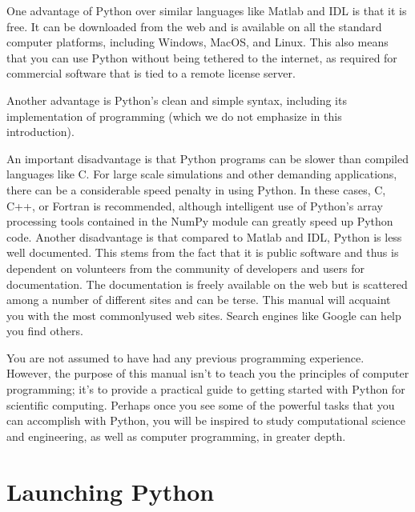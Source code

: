 \documentclass[letterpaper,10pt,english]{sphinxmanual}
\begin{document}
\sphinxAtStartPar
One advantage of Python over similar languages like Matlab and IDL is that it is free.  It can be downloaded from the web and is available on all the standard computer platforms, including Windows, MacOS, and Linux.  This also means that you can use Python without being tethered to the internet, as required for commercial software that is tied to a remote license server.

\sphinxAtStartPar
Another advantage is Python’s clean and simple syntax, including its implementation of  programming (which we do not emphasize in this introduction).

\sphinxAtStartPar
An important disadvantage is that Python programs can be slower than compiled languages like C.  For large scale simulations and other demanding applications, there can be a considerable speed penalty in using Python.  In these cases, C, C++, or Fortran is recommended, although intelligent use of Python’s array processing tools contained in the NumPy module can greatly speed up Python code.  Another disadvantage is that compared to Matlab and IDL, Python is less well documented.  This stems from the fact that it is public  software and thus is dependent on volunteers from the community of developers and users for documentation.  The documentation is freely available on the web but is scattered among a number of different sites and can be terse.  This manual will acquaint you with the most commonly\sphinxhyphen{}used web sites.  Search engines like Google can help you find others.

\sphinxAtStartPar
You are not assumed to have had any previous programming experience.  However, the purpose of this manual isn’t to teach you the principles of computer programming; it’s to provide a practical guide to getting started with Python for scientific computing.  Perhaps once you see some of the powerful tasks that you can accomplish with Python, you will be inspired to study computational science and engineering, as well as computer programming, in greater depth.

\sphinxstepscope


\chapter{Launching Python}
\label{\detokenize{chap2/chap2_basics:launching-python}}\label{\detokenize{chap2/chap2_basics:chap2}}\label{\detokenize{chap2/chap2_basics::doc}}
\end{document}
